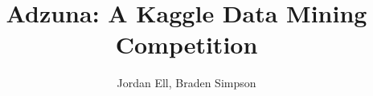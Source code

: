 \documentclass[conference]{IEEEtran}
\begin{document}
\title{Adzuna: A Kaggle Data Mining Competition}
\author{Jordan Ell, Braden Simpson}

\maketitle










\end{document}
